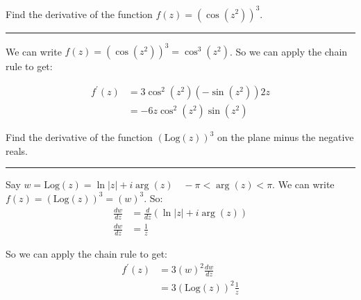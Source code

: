 \begin{example}

    Find the derivative of the function $f(z)=(\cos(z^2))^3.$\\

    \hrule
    \vspace{0.5cm}

    We can write $f(z) = (\cos(z^2))^3 = \cos^3(z^2)$. So we can apply the chain rule to get:

    \begin{align*}
        f^{\prime}(z) & = 3\cos^2(z^2)\left(-\sin(z^2)\right)2z \\
                      & = -6z\cos^2(z^2)\sin(z^2)
    \end{align*}
\end{example}



\begin{example}

    Find the derivative of the function $(\text{Log}(z))^3$ on the plane minus the negative reals.\\

    \hrule
    \vspace{0.5cm}

    Say $w = \text{Log}(z) = \ln|z| + i\arg(z) \quad -\pi < \arg(z) < \pi$.
    We can write $f(z) = (\text{Log}(z))^3 = (w)^3$. So:
    \begin{align*}
        \frac{dw}{dz} & = \frac{d}{dz}(\ln|z| + i\arg(z)) \\
        \frac{dw}{dz} & =\frac{1}{z}
    \end{align*}

    So we can apply the chain rule to get:
    \begin{align*}
        f^{\prime}(z) & = 3(w)^2\frac{dw}{dz}           \\
                      & = 3(\text{Log}(z))^2\frac{1}{z}
    \end{align*}
\end{example}


